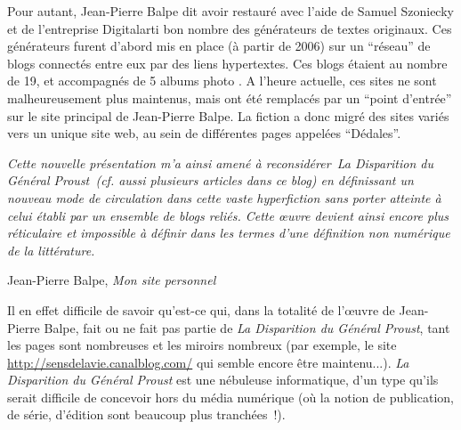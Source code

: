 \documentclass{article}
\newenvironment{citationbox}
{\begin{center}
		\begin{minipage}{.8\textwidth}
		}
		{
		\end{minipage}	
\end{center}
}
\begin{document}
					Pour autant, Jean-Pierre Balpe dit avoir restauré avec l'aide de Samuel Szoniecky et de l'entreprise Digitalarti bon nombre des générateurs de textes originaux. Ces générateurs furent d'abord mis en place (à partir de 2006) sur un ``réseau'' de blogs connectés entre eux par des liens hypertextes. Ces blogs étaient au nombre de 19, et accompagnés de 5 albums photo \cite{bordeleau2009}. A l'heure actuelle, ces sites ne sont malheureusement plus maintenus, mais ont été remplacés par un ``point d'entrée'' sur le site principal de Jean-Pierre Balpe. La fiction a donc migré des sites variés vers un unique site web, au sein de différentes pages appelées ``Dédales''.
					\begin{citationbox}
						\textit{Cette nouvelle présentation m'a ainsi amené à reconsidérer La Disparition du Général Proust (cf. aussi plusieurs articles dans ce blog) en définissant un nouveau mode de circulation dans cette vaste hyperfiction sans porter atteinte à celui établi par un ensemble de blogs reliés. Cette œuvre devient ainsi encore plus réticulaire et impossible à définir dans les termes d'une définition non numérique de la littérature.}\begin{flushright}
							Jean-Pierre Balpe, \textit{Mon site personnel}\cite{balpe_blog}
						\end{flushright}
					\end{citationbox}
					Il en effet difficile de savoir qu'est-ce qui, dans la totalité de l'œuvre de Jean-Pierre Balpe, fait ou ne fait pas partie de \textit{La Disparition du Général Proust}, tant les pages sont nombreuses et les miroirs nombreux (par exemple, le site \href{http://sensdelavie.canalblog.com/}{http://sensdelavie.canalblog.com/} qui semble encore être maintenu...). \textit{La Disparition du Général Proust} est une nébuleuse informatique, d'un type qu'ils serait difficile de concevoir hors du média numérique (où la notion de publication, de série, d'édition sont beaucoup plus tranchées~!).\\
					
\end{document}
